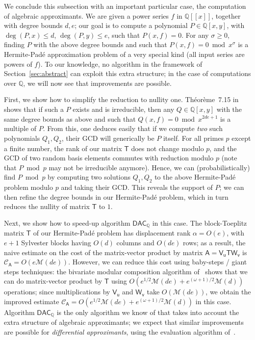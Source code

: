\documentclass[sigconf]{acmart}
\newcommand{\vu}{\ensuremath{\mathsf{u}}}
\newcommand{\vv}{\ensuremath{\mathsf{v}}}
\newcommand{\mA}{\ensuremath{\mathsf{A}}}
\newcommand{\mT}{\ensuremath{\mathsf{T}}}
\newcommand{\mV}{\ensuremath{\mathsf{V}}}
\newcommand{\mW}{\ensuremath{\mathsf{W}}}
\newcommand{\Q}{\ensuremath{\mathbb{Q}}}
\newcommand{\M}{\ensuremath{\mathscr{M}}}
\newcommand{\CA}{\ensuremath{\mathscr{C}_\mA}}
\newcommand{\DACQ}{\ensuremath{\mathsf{DAC}_\Q}}
\theoremstyle{acmdefinition}
\begin{document}
We conclude this subsection with an important
particular case, the computation of algebraic approximants. We are
given a power series $f$ in $\Q[[x]]$, together with degree bounds
$d,e$; our goal is to compute a polynomial $P \in \Q[x,y]$, with
$\deg(P,x) \le d$, $\deg(P,y) \le e$, such that $P(x,f) = 0$.
For any $\sigma \ge 0$, finding $P$ with the above degree bounds and
such that $P(x,f) = 0 \bmod x^\sigma$ is a Hermite-Pad\'e
approximation problem of a very special kind (all input series are
powers of $f$). To our knowledge, no algorithm in the framework of
Section~\ref{sec:abstract} can exploit this extra structure;
in the case of computations over $\Q$, we will now see that
improvements are possible.

First, we show how to simplify the reduction to nullity one.
Th\'eo\-r\`eme~7.15 in~\cite{BoChGiLeLeSaSc17} shows that if such a
$P$ exists and is irreducible, then any $Q \in \Q[x,y]$ with the same
degree bounds as above and such that $Q(x,f) = 0 \bmod x^{2de+1}$ is a
multiple of $P$.  From this, one deduces easily that if we compute
\emph{two} such polynomials $Q_1,Q_2$, their GCD will generically be
$P$ itself. For all primes $p$ except a finite number, the rank of our
matrix $\mT$ does not change modulo $p$, and the GCD of two random
basis elements commutes with reduction modulo $p$ (note that $P \bmod
p$ may not be irreducible anymore). Hence, we can (probabilistically)
find $P \bmod p$ by computing two solutions $Q_1,Q_2$ to the above
Hermite-Pad\'e problem modulo $p$ and taking their GCD. This reveals
the support of $P$; we can then refine the degree bounds in our
Hermite-Pad\'e problem, which in turn reduces the nullity of matrix
$\mT$ to $1$.

Next, we show how to speed-up algorithm $\DACQ$ in this case. The
block-Toeplitz matrix $\mT$ of our Hermite-Pad\'e problem has
displacement rank $\alpha = O(e)$, with $e+1$ Sylvester blocks having
$O(d)$ columns and $O(de)$ rows; as a result, the naive estimate on
the cost of the matrix-vector product by matrix $\mA = \mV_\vu \mT
\mW_\vv$ is $\CA=O(e \M(de))$. However, we can reduce this cost using
baby-steps / giant steps techniques: the bivariate modular composition
algorithm of~\cite{NuZi04} shows that we can do matrix-vector product
by $\mT$ using $O(e^{1/2} \M(de) + e^{(\omega+1)/2} \M(d))$
operations; since multiplications by $\mV_\vu$ and $\mW_\vv$ take
$O(\M(de))$, we obtain the improved estimate $\CA=O(e^{1/2} \M(de) +
e^{(\omega+1)/2} \M(d))$ in this case. Algorithm $\DACQ$ is the only
algorithm we know of that takes into account the extra structure of
algebraic approximants; we expect that similar improvements are
possible for {\em differential approximants}, using the evaluation
algorithm of~\cite{BoSc09}.
\end{document}
